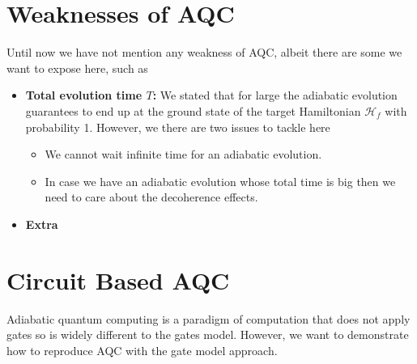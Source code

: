 \section{Weaknesses of AQC}
Until now we have not mention any weakness of AQC, albeit there are some we want to expose here, such as
\begin{itemize}
    \item \textbf{Total evolution time $T$:} We stated that for large the adiabatic evolution guarantees to end up at the ground state of the target Hamiltonian $\mathcal{H}_{f}$ with probability 1. However, we there are two issues to tackle here
    \begin{itemize}
        \item We cannot wait infinite time for an adiabatic evolution.
        \item In case we have an adiabatic evolution whose total time is big then we need to care about the decoherence effects.
    \end{itemize}
    \item \textbf{Extra}
\end{itemize}
\section{Circuit Based AQC}
Adiabatic quantum computing is a paradigm of computation that does not apply gates so is widely different to the gates model. However, we want to demonstrate how to reproduce AQC with the gate model approach.
